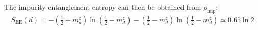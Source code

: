 \documentclass{revtex4-2}
\begin{document}
The impurity entanglement entropy can then be obtained from \(\rho_\text{imp}\):
\begin{equation}\begin{aligned}
	S_\text{EE}(d) = -\left( \frac{1}{2} + m_d^z \right) \ln\left( \frac{1}{2} + m_d^z \right) - \left( \frac{1}{2} - m_d^z \right) \ln\left( \frac{1}{2} - m_d^z \right) \simeq 0.65\ln 2
\end{aligned}\end{equation}
\end{document}
